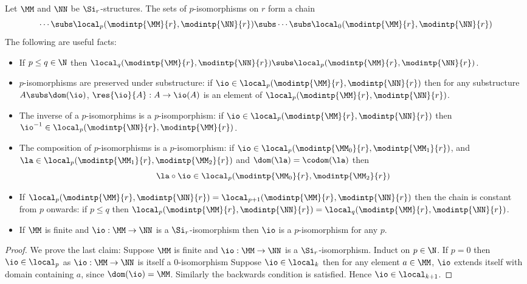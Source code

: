 \begin{prop}
    Let $\MM$ and $\NN$ be $\Si_r$-structures.
    The sets of $p$-isomorphisms on $r$ form a chain
    \[\cdots \subs \local_p(\modintp{\MM}{r},\modintp{\NN}{r}) \subs \cdots 
    \subs \local_0(\modintp{\MM}{r},\modintp{\NN}{r})\]
    The following are useful facts:
    \begin{itemize}
        \item If $p \leq q \in \N$ then 
            $\local_q(\modintp{\MM}{r},\modintp{\NN}{r}) \subs
            \local_p(\modintp{\MM}{r},\modintp{\NN}{r})$.
        \item $p$-isomorphisms are preserved under substructure:
            if $\io \in \local_p(\modintp{\MM}{r},\modintp{\NN}{r})$
            then for any substructure $A \subs \dom(\io)$, 
            $\res{\io}{A} : A \to \io(A)$ is an element of 
            $\local_p(\modintp{\MM}{r},\modintp{\NN}{r})$.
        \item The inverse of a $p$-isomorphims is a $p$-isomporphism:
            if $\io \in \local_p(\modintp{\MM}{r},\modintp{\NN}{r})$
            then $\io^{-1} \in \local_p(\modintp{\NN}{r},\modintp{\MM}{r})$.
        \item The composition of $p$-isomorphisms is a $p$-isomorphism:
            if $\io \in \local_p(\modintp{\MM_0}{r},\modintp{\MM_1}{r})$,
            and $\la \in \local_p(\modintp{\MM_1}{r},\modintp{\MM_2}{r})$
            and $\dom(\la) = \codom(\la)$ then 
            \[  
                \la \circ \io \in 
                \local_p(\modintp{\MM_0}{r},\modintp{\MM_2}{r})
            \]
        \item If $\local_p(\modintp{\MM}{r},\modintp{\NN}{r}) = 
            \local_{p+1}(\modintp{\MM}{r},\modintp{\NN}{r})$
            then the chain is constant from $p$ onwards:
            if $p \leq q$ then $\local_p(\modintp{\MM}{r},\modintp{\NN}{r})
            = \local_q(\modintp{\MM}{r},\modintp{\NN}{r})$.
        \item If $\MM$ is finite and $\io : \MM \to \NN$ 
            is a $\Si_r$-isomorphism then $\io$ 
            is a $p$-isomorphism for any $p$.
    \end{itemize}
\end{prop}
\begin{proof}
    We prove the last claim:
    Suppose $\MM$ is finite and $\io : \MM \to \NN$ 
    is a $\Si_r$-isomorphism.
    Induct on $p \in \N$.
    If $p = 0$ then $\io \in \local_p$ as 
    $\io : \MM \to \NN$ is itself a $0$-isomorphism
    Suppose $\io \in \local_{k}$ then 
    for any element $a \in \MM$, 
    $\io$ extends itself with domain containing $a$,
    since $\dom(\io) = \MM$.
    Similarly the backwards condition is satisfied.
    Hence $\io \in \local_{k+1}$.
\end{proof}

